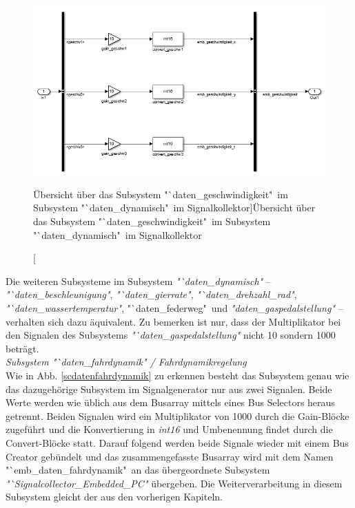 \documentclass[fontsize = 12pt, paper = a4]{scrreprt}
\begin{document}
\begin{figure}[h]
\centering
\includegraphics[scale = 0.77]{sc_daten_geschwindigkeit}
\caption[Übersicht über das Subsystem "`daten\_geschwindigkeit"\ im Subsystem "`daten\_dynamisch"\ im Signalkollektor]{Übersicht über das Subsystem "`daten\_geschwindigkeit"\ im Subsystem "`daten\_dynamisch"\ im Signalkollektor}
\label{scdatengeschwindigkeit}
\end{figure}

\newpage


Die weiteren Subsysteme im Subsystem \textit{"`daten\_dynamisch"} -- \textit{"`daten\_beschleunigung"}, \textit{"`daten\_gierrate"}, \textit{"`daten\_drehzahl\_rad"}, \textit{"`daten\_wassertemperatur"}, "`daten\_federweg"\ und \textit{"daten\_gaspedalstellung"} -- verhalten sich dazu äquivalent. Zu bemerken ist nur, dass der Multiplikator bei den Signalen des Subsystems \textit{"`daten\_gaspedalstellung"} nicht 10 sondern 1000 beträgt. \\


\textit{Subsystem "`daten\_fahrdynamik" / Fahrdynamikregelung} \\

Wie in Abb. \ref{scdatenfahrdynamik} zu erkennen besteht das Subsystem genau wie das dazugehörige Subsystem im Signalgenerator nur aus zwei Signalen. Beide Werte werden wie üblich aus dem Busarray mittels eines Bus Selectors heraus getrennt. Beiden Signalen wird ein Multiplikator von 1000 durch die Gain-Blöcke zugeführt und die Konvertierung in \textit{int16} und Umbenennung findet durch die Convert-Blöcke statt. Darauf folgend werden beide Signale wieder mit einem Bus Creator gebündelt und das zusammengefasste Busarray wird mit dem Namen "`emb\_daten\_fahrdynamik"\ an das übergeordnete Subsystem \textit{"`Signalcollector\_Embedded\_PC"} übergeben. Die Weiterverarbeitung in diesem Subsystem gleicht der aus den vorherigen Kapiteln.
\end{document}
